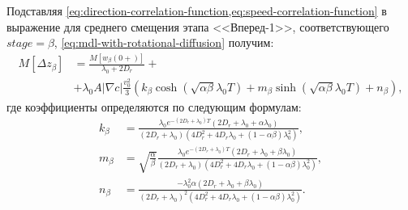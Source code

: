 Подставляя \cref{eq:direction-correlation-function,eq:speed-correlation-function} в выражение для среднего смещения этапа <<Вперед-1>>, соответствующего $stage=\beta$, \cref{eq:mdl-with-rotational-diffusion} получим:
\begin{equation}
    \begin{aligned}
        M\left [\Delta z_{\beta} \right ]&=\frac{M\left [w_{\beta}(0+) \right ]}{\lambda_0+2 D_r} + \\ &+ \lambda_0 A |\nabla c| \frac{v_0^2}{3} \left ( k_{\beta} \cosh\left (\sqrt{\alpha \beta} \lambda_0 T \right ) + m_{\beta} \sinh\left (\sqrt{\alpha \beta} \lambda_0 T \right ) + n_{\beta} \right ),
        \label{eq:mdlrd-solution-beta}
    \end{aligned}
\end{equation}
где коэффициенты определяются по следующим формулам:
\begin{equation}
    \begin{aligned}
        k_{\beta}&=\frac{\lambda_0 e^{-(2D_r+\lambda_0)T}\left (2D_r+\lambda_0+\alpha\lambda_0 \right )}{(2D_r+\lambda_0)\left (4D_r^2+4D_r\lambda_0+(1-\alpha\beta)\lambda_0^2\right )}, \\
        m_{\beta}&=\sqrt{\frac{\alpha}{\beta}}\frac{\lambda_0 e^{-(2D_r+\lambda_0)T}\left (2D_r+\lambda_0+\beta\lambda_0 \right )}{(2D_r+\lambda_0)\left (4D_r^2+4D_r\lambda_0+(1-\alpha\beta)\lambda_0^2 \right )}, \\
        n_{\beta}&=\frac{-\lambda_0^2 \alpha \left (2D_r+\lambda_0+\beta\lambda_0 \right )}{(2D_r+\lambda_0)^2\left (4D_r^2+4D_r\lambda_0+(1-\alpha\beta)\lambda_0^2 \right )}. \\
        \label{eq:mdlrd-solution-beta-coeffs}
    \end{aligned}
\end{equation}

